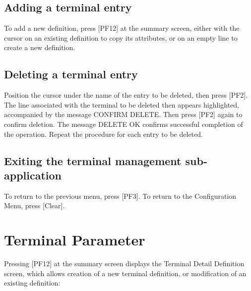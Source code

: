 \documentclass[letterpaper,10pt,english]{sphinxmanual}
\begin{document}
\subsection{Adding a terminal entry}
\label{\detokenize{connectivity_guide:adding-a-terminal-entry}}
To add a new definition, press {[}PF12{]} at the summary screen, either with the cursor on an existing definition to copy its attributes, or on an empty line to create a new definition.


\subsection{Deleting a terminal entry}
\label{\detokenize{connectivity_guide:deleting-a-terminal-entry}}
Position the cursor under the name of the entry to be deleted, then press {[}PF2{]}. The line associated with the terminal to be deleted then appears highlighted, accompanied by the message CONFIRM DELETE. Then press {[}PF2{]} again to confirm deletion. The message DELETE OK confirms successful completion of the operation. Repeat the procedure for each entry to be deleted.


\subsection{Exiting the terminal management sub-application}
\label{\detokenize{connectivity_guide:exiting-the-terminal-management-sub-application}}
To return to the previous menu, press {[}PF3{]}. To return to the Configuration Menu, press {[}Clear{]}.


\section{Terminal Parameter}
\label{\detokenize{connectivity_guide:terminal-parameter}}
Pressing {[}PF12{]} at the summary screen displays the Terminal Detail Definition screen, which allows creation of a new terminal definition, or modification of an existing definition:


\end{document}
